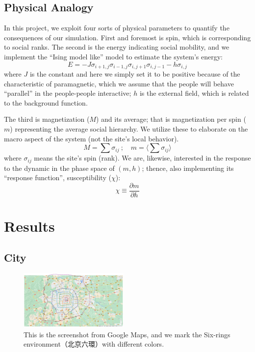 \documentclass[10pt]{article}
\begin{document}
\begin{multicols}{2}
    
    \subsection{Physical Analogy}
        In this project, we exploit four sorts of physical parameters to quantify the consequences of our simulation. First and foremost is spin, which is corresponding to social ranks. The second is the energy indicating social mobility, and we implement the ``Ising model like'' model to estimate the system's energy:
        \[
            E = -J\sigma_{i+1,j}\sigma_{i-1,j}\sigma_{i,j+1}\sigma_{i,j-1} - h\sigma_{i,j}
        \]
        where $J$ is the constant and here we simply set it to be positive because of the characteristic of paramagnetic, which we assume that the people will behave ``parallel'' in the people-people interactive; $h$ is the external field, which is related to the background function.

        The third is magnetization ($M$) and its average; that is magnetization per spin ($m$) representing the average social hierarchy. We utilize these to elaborate on the macro aspect of the system (not the site's local behavior).
        \[
            M = \sum \sigma_{ij}\ ;\quad m = \big\langle \sum \sigma_{ij} \big\rangle
        \]
        where $\sigma_{ij}$ means the site's spin (rank). We are, likewise, interested in the response to the dynamic in the phase space of $(m,h)$; thence, also implementing its ``response function'', susceptibility ($\chi$):
        \[
            \chi \equiv \frac{\partial m}{\partial h}
        \]
    
\section{Results}
    \subsection{City}
        \begin{figure}[H]
            \centering 
            \includegraphics[width = 0.48\textwidth]{BeijingGoogle.PNG}
            \caption{This is the screenshot from Google Maps, and we mark the Six-rings environment（北京六環）with different colors.}
            \label{Google}
        \end{figure}
    

\end{multicols}
\end{document}
